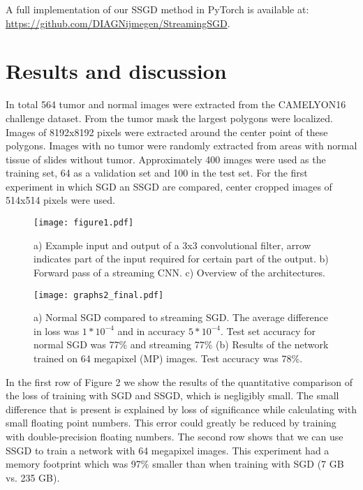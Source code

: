 \documentclass{article}
\begin{document}
A full implementation of our SSGD method in PyTorch is available at: \url{https://github.com/DIAGNijmegen/StreamingSGD}.

\section{Results and discussion}
In total 564 tumor and normal images were extracted from the CAMELYON16 challenge dataset\cite{doi:10.1001/jama.2017.14585}. From the tumor mask the largest polygons were localized. Images of 8192x8192 pixels were extracted around the center point of these polygons. Images with no tumor were randomly extracted from areas with normal tissue of slides without tumor. Approximately 400 images were used as the training set, 64 as a validation set and 100 in the test set. For the first experiment in which SGD an SSGD are compared, center cropped images of 514x514 pixels were used.

\begin{figure}[h]
    \centering
    \def\svgwidth{\columnwidth}
	\texttt{[image: figure1.pdf]}
    \caption{a) Example input and output of a 3x3 convolutional filter, arrow indicates part of the input required for certain part of the output. b) Forward pass of a streaming CNN. c) Overview of the architectures.}
\end{figure}

\begin{figure}[h]
    \centering
    \def\svgwidth{\columnwidth}
    \texttt{[image: graphs2\_final.pdf]}
    \caption{a) Normal SGD compared to streaming SGD. The average difference in loss was 
    $1*10^{-4}$ and in accuracy $5*10^{-4}$. Test set accuracy for normal SGD was 77\% and streaming 77\% (b) Results of the network trained on 64 megapixel (MP) images. Test accuracy was 78\%.}
\end{figure}

In the first row of Figure 2 we show the results of the quantitative comparison of the loss of training with SGD and SSGD, which is negligibly small. The small difference that is present is explained by loss of significance while calculating with small floating point numbers. This error could greatly be reduced by training with double-precision floating numbers. The second row shows that we can use SSGD to train a network with 64 megapixel images. This experiment had a memory footprint which was 97\% smaller than when training with SGD (7 GB vs. 235 GB). 
\end{document}
